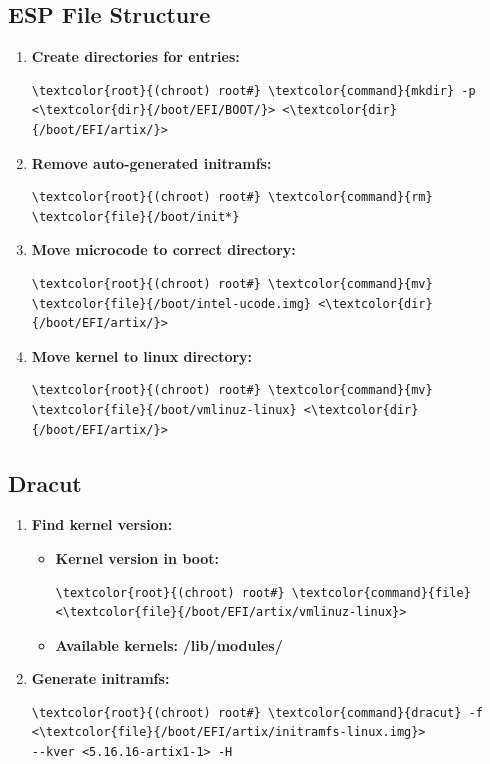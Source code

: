 \documentclass[10pt, a4paper, onecolumn, oneside, titlepage, openany]{book}
\begin{document}
\subsection{ESP File Structure}
\begin{enumerate}
    \item \textbf{Create directories for entries:}
\begin{Verbatim}[commandchars=\\\{\}]
\textcolor{root}{(chroot) root#} \textcolor{command}{mkdir} -p <\textcolor{dir}{/boot/EFI/BOOT/}> <\textcolor{dir}{/boot/EFI/artix/}>
\end{Verbatim}
    \item \textbf{Remove auto-generated initramfs:}
\begin{Verbatim}[commandchars=\\\{\}]
\textcolor{root}{(chroot) root#} \textcolor{command}{rm} \textcolor{file}{/boot/init*}
\end{Verbatim}
    \item \textbf{Move microcode to correct directory:}
\begin{Verbatim}[commandchars=\\\{\}]
\textcolor{root}{(chroot) root#} \textcolor{command}{mv} \textcolor{file}{/boot/intel-ucode.img} <\textcolor{dir}{/boot/EFI/artix/}>
\end{Verbatim}
    \item \textbf{Move kernel to linux directory:}
\begin{Verbatim}[commandchars=\\\{\}]
\textcolor{root}{(chroot) root#} \textcolor{command}{mv} \textcolor{file}{/boot/vmlinuz-linux} <\textcolor{dir}{/boot/EFI/artix/}>
\end{Verbatim}
\end{enumerate}
\subsection{Dracut}
\begin{enumerate}
    \item \textbf{Find kernel version:}
    \begin{itemize}
        \item \textbf{Kernel version in boot:}
\begin{Verbatim}[commandchars=\\\{\}]
\textcolor{root}{(chroot) root#} \textcolor{command}{file} <\textcolor{file}{/boot/EFI/artix/vmlinuz-linux}>
\end{Verbatim}
        \item \textbf{Available kernels:}
\newline \textbf{\textcolor{dir}{/lib/modules/}}
    \end{itemize}
    \item \textbf{Generate initramfs:}
\begin{Verbatim}[commandchars=\\\{\}]
\textcolor{root}{(chroot) root#} \textcolor{command}{dracut} -f <\textcolor{file}{/boot/EFI/artix/initramfs-linux.img}>
--kver <5.16.16-artix1-1> -H
\end{Verbatim}
\end{enumerate}
\end{document}
